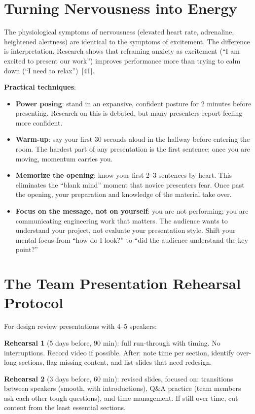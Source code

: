 \section{Turning Nervousness into Energy}
The physiological symptoms of nervousness (elevated heart rate, adrenaline, heightened alertness) are identical to the symptoms of excitement. The difference is interpretation. Research shows that reframing anxiety as excitement (``I am excited to present our work'') improves performance more than trying to calm down (``I need to relax'')~[41].

\textbf{Practical techniques}:
\begin{itemize}[nosep,leftmargin=1.5em]
\item \textbf{Power posing}: stand in an expansive, confident posture for 2 minutes before presenting. Research on this is debated, but many presenters report feeling more confident.
\item \textbf{Warm-up}: say your first 30 seconds aloud in the hallway before entering the room. The hardest part of any presentation is the first sentence; once you are moving, momentum carries you.
\item \textbf{Memorize the opening}: know your first 2--3 sentences by heart. This eliminates the ``blank mind'' moment that novice presenters fear. Once past the opening, your preparation and knowledge of the material take over.
\item \textbf{Focus on the message, not on yourself}: you are not performing; you are communicating engineering work that matters. The audience wants to understand your project, not evaluate your presentation style. Shift your mental focus from ``how do I look?'' to ``did the audience understand the key point?''
\end{itemize}

\section{The Team Presentation Rehearsal Protocol}
For design review presentations with 4--5 speakers:

\textbf{Rehearsal 1} (5 days before, 90 min): full run-through with timing. No interruptions. Record video if possible. After: note time per section, identify over-long sections, flag missing content, and list slides that need redesign.

\textbf{Rehearsal 2} (3 days before, 60 min): revised slides, focused on: transitions between speakers (smooth, with introductions), Q\&A practice (team members ask each other tough questions), and time management. If still over time, cut content from the least essential sections.

